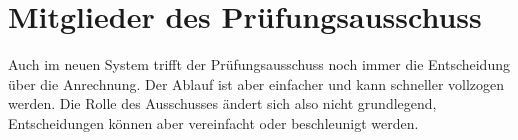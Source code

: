 \section*{Mitglieder des Prüfungsausschuss}

Auch im neuen System trifft der Prüfungsausschuss noch immer die Entscheidung über die Anrechnung. Der Ablauf ist aber einfacher und kann schneller vollzogen werden. Die Rolle des Ausschusses ändert sich also nicht grundlegend, Entscheidungen können aber vereinfacht oder beschleunigt werden.